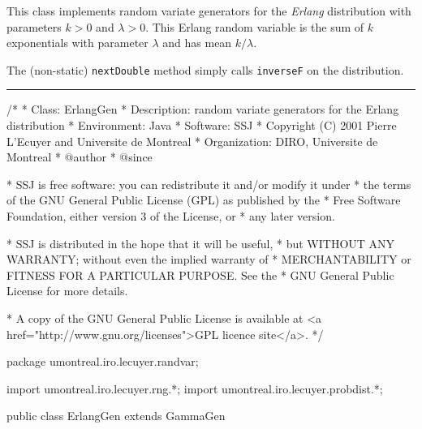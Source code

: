 
This class implements random variate generators for the {\em Erlang\/} 
distribution with parameters $k > 0$ and $\lambda > 0$.
This Erlang random variable is the sum of $k$ exponentials with 
parameter $\lambda$ and has mean $k/\lambda$.

The (non-static) \texttt{nextDouble} method simply calls \texttt{inverseF} on the
distribution. 


\bigskip\hrule

\begin{code}
\begin{hide}
/*
 * Class:        ErlangGen
 * Description:  random variate generators for the Erlang distribution
 * Environment:  Java
 * Software:     SSJ 
 * Copyright (C) 2001  Pierre L'Ecuyer and Universite de Montreal
 * Organization: DIRO, Universite de Montreal
 * @author       
 * @since

 * SSJ is free software: you can redistribute it and/or modify it under
 * the terms of the GNU General Public License (GPL) as published by the
 * Free Software Foundation, either version 3 of the License, or
 * any later version.

 * SSJ is distributed in the hope that it will be useful,
 * but WITHOUT ANY WARRANTY; without even the implied warranty of
 * MERCHANTABILITY or FITNESS FOR A PARTICULAR PURPOSE.  See the
 * GNU General Public License for more details.

 * A copy of the GNU General Public License is available at
   <a href="http://www.gnu.org/licenses">GPL licence site</a>.
 */
\end{hide}
package umontreal.iro.lecuyer.randvar;\begin{hide}
import umontreal.iro.lecuyer.rng.*;
import umontreal.iro.lecuyer.probdist.*;
\end{hide}

public class ErlangGen extends GammaGen \begin{hide} {
   protected int    k = -1;

\end{hide}\end{code}

